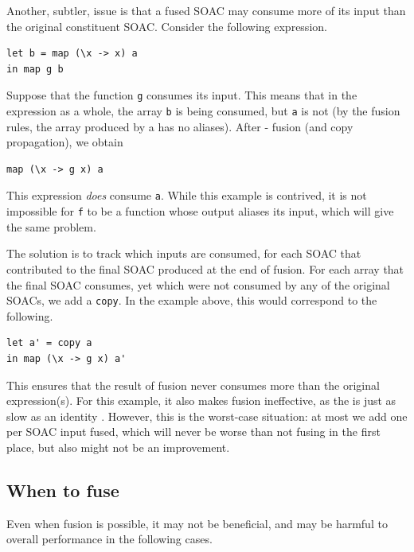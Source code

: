 Another, subtler, issue is that a fused SOAC may consume more of its
input than the original constituent SOAC.  Consider the following
expression.
\begin{lstlisting}
let b = map (\x -> x) a
in map g b
\end{lstlisting}
Suppose that the function \texttt{g} consumes its input.  This means
that in the expression as a whole, the array \texttt{b} is being
consumed, but \texttt{a} is not (by the fusion rules, the array
produced by a  has no aliases).  After -
fusion (and copy propagation), we obtain
\begin{lstlisting}
map (\x -> g x) a
\end{lstlisting}
This expression \textit{does} consume \texttt{a}.  While this example
is contrived, it is not impossible for \texttt{f} to be a function
whose output aliases its input, which will give the same problem.

The solution is to track which inputs are consumed, for each SOAC that
contributed to the final SOAC produced at the end of fusion.  For each
array that the final SOAC consumes, yet which were not consumed by any
of the original SOACs, we add a \texttt{copy}.  In the example above,
this would correspond to the following.
\begin{lstlisting}
let a' = copy a
in map (\x -> g x) a'
\end{lstlisting}%
This ensures that the result of fusion never consumes more than the
original expression(s).  For this example, it also makes fusion
ineffective, as the  is just as slow as an identity .
However, this is the worst-case situation: at most we add one 
per SOAC input fused, which will never be worse than not fusing in the
first place, but also might not be an improvement.

\subsection{When to fuse}
\label{sec:whentofuse}

Even when fusion is possible, it may not be beneficial, and may be
harmful to overall performance in the following cases.

